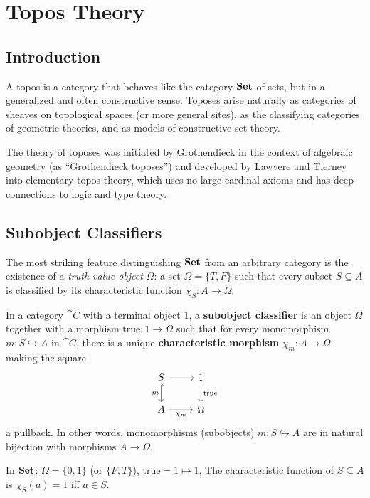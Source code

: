 \chapter{Topos Theory}
\label{ch:topos}

\section{Introduction}

A topos is a category that behaves like the category $\mathbf{Set}$ of sets, but in a generalized and often constructive sense. Toposes arise naturally as categories of sheaves on topological spaces (or more general sites), as the classifying categories of geometric theories, and as models of constructive set theory.

The theory of toposes was initiated by Grothendieck in the context of algebraic geometry (as ``Grothendieck toposes'') and developed by Lawvere and Tierney into elementary topos theory, which uses no large cardinal axioms and has deep connections to logic and type theory.

\section{Subobject Classifiers}

The most striking feature distinguishing $\mathbf{Set}$ from an arbitrary category is the existence of a \emph{truth-value object} $\Omega$: a set $\Omega = \{T, F\}$ such that every subset $S \subseteq A$ is classified by its characteristic function $\chi_S: A \to \Omega$.

\begin{definition}
In a category $\cat{C}$ with a terminal object $1$, a \textbf{subobject classifier} is an object $\Omega$ together with a morphism $\mathrm{true}: 1 \to \Omega$ such that for every monomorphism $m: S \hookrightarrow A$ in $\cat{C}$, there is a unique \textbf{characteristic morphism} $\chi_m: A \to \Omega$ making the square
\[
  \begin{tikzcd}
    S \arrow[r] \arrow[d, "m"', hook] & 1 \arrow[d, "\mathrm{true}"] \\
    A \arrow[r, "\chi_m"'] & \Omega
  \end{tikzcd}
\]
a pullback. In other words, monomorphisms (subobjects) $m: S \hookrightarrow A$ are in natural bijection with morphisms $A \to \Omega$.
\end{definition}

\begin{example}
In $\mathbf{Set}$: $\Omega = \{0,1\}$ (or $\{F,T\}$), $\mathrm{true} = 1 \mapsto 1$. The characteristic function of $S \subseteq A$ is $\chi_S(a) = 1$ iff $a \in S$.
\end{example}


